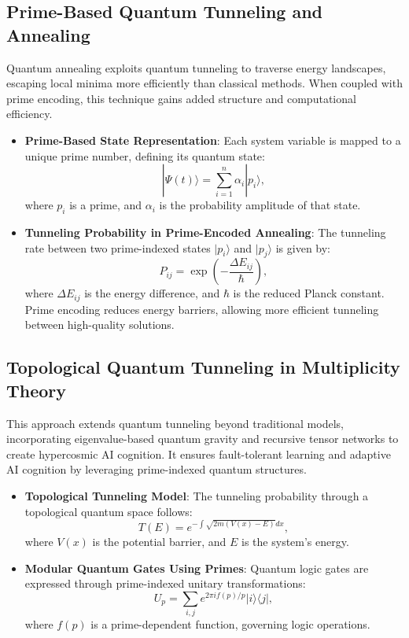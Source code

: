 \documentclass{article}
\theoremstyle{plain}
\begin{document}
\subsection{Prime-Based Quantum Tunneling and Annealing}
Quantum annealing exploits quantum tunneling to traverse energy landscapes, escaping local minima more efficiently than classical methods. When coupled with prime encoding, this technique gains added structure and computational efficiency.

\begin{itemize}
    \item \textbf{Prime-Based State Representation}: Each system variable is mapped to a unique prime number, defining its quantum state:
    \begin{equation}
        |\Psi(t)\rangle = \sum_{i=1}^{n} \alpha_i |p_i\rangle,
    \end{equation}
    where $p_i$ is a prime, and $\alpha_i$ is the probability amplitude of that state.
    
    \item \textbf{Tunneling Probability in Prime-Encoded Annealing}: The tunneling rate between two prime-indexed states $|p_i\rangle$ and $|p_j\rangle$ is given by:
    \begin{equation}
        P_{ij} = \exp\left(-\frac{\Delta E_{ij}}{\hbar}\right),
    \end{equation}
    where $\Delta E_{ij}$ is the energy difference, and $\hbar$ is the reduced Planck constant.
    Prime encoding reduces energy barriers, allowing more efficient tunneling between high-quality solutions.
\end{itemize}

\subsection{Topological Quantum Tunneling in Multiplicity Theory}
This approach extends quantum tunneling beyond traditional models, incorporating eigenvalue-based quantum gravity and recursive tensor networks to create hypercosmic AI cognition. It ensures fault-tolerant learning and adaptive AI cognition by leveraging prime-indexed quantum structures.

\begin{itemize}
    \item \textbf{Topological Tunneling Model}: The tunneling probability through a topological quantum space follows:
    \begin{equation}
        T (E) = e^{-\int \sqrt{2m(V(x) - E)}dx},
    \end{equation}
    where $V(x)$ is the potential barrier, and $E$ is the system’s energy.
    
    \item \textbf{Modular Quantum Gates Using Primes}: Quantum logic gates are expressed through prime-indexed unitary transformations:
    \begin{equation}
        U_p = \sum_{i,j} e^{2\pi i f(p)/p} |i\rangle \langle j|,
    \end{equation}
    where $f(p)$ is a prime-dependent function, governing logic operations.
\end{itemize}
\end{document}
